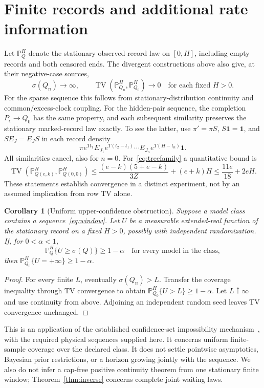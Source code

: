 \documentclass[aps,pre,onecolumn,11pt,longbibliography,notitlepage]{revtex4-2}
\newtheorem{corollary}[theorem]{Corollary}
\newcommand{\1}{\mathbf 1}
\newcommand{\TV}{\operatorname{TV}}
\newcommand{\sig}{\sigma}
\begin{document}
\section{Finite records and additional rate information}\label{sec:records}
Let $\mathbb P_{Q}^{H}$ denote the stationary observed-record law on $[0,H]$, including empty records and both censored ends. The divergent constructions above also give, at their negative-case sources,
\begin{equation}
 \sig(Q_n)\to\infty,\qquad\TV(\mathbb P_{Q_n}^{H},\mathbb P_{Q_0}^{H})\to0
 \quad\text{for each fixed }H>0.\label{eq:window}
\end{equation}
For the sparse sequence this follows from stationary-distribution continuity and common/excess-clock coupling. For the hidden-pair sequence, the completion $P_\epsilon\to Q_0$ has the same property, and each subsequent similarity preserves the stationary marked-record law exactly. To see the latter, use $\pi'=\pi S$, $S\1=\1$, and $SE_J=E_JS$ in each record density
\begin{equation}
 \pi e^{Tt_1}E_{J_1}e^{T(t_2-t_1)}\cdots E_{J_n}e^{T(H-t_n)}\1.\label{eq:likelihood}
\end{equation}
All similarities cancel, also for $n=0$. For~\eqref{eq:treefamily} a quantitative bound is
\begin{equation}
 \TV(\mathbb P_{Q(e,k)}^{H},\mathbb P_{Q(0,0)}^{H})
 \le\frac{(e-k)(5+e-k)}{3Z}+(e+k)H
 \le\frac{11e}{18}+2eH.\label{eq:windowtree}
\end{equation}
These statements establish convergence in a distinct experiment, not by an assumed implication from row TV alone.

\begin{corollary}[Uniform upper-confidence obstruction]\label{cor:confidence}
Suppose a model class contains a sequence~\eqref{eq:window}. Let $U$ be a measurable extended-real function of the stationary record on a fixed $H>0$, possibly with independent randomization. If, for $0<\alpha<1$,
\begin{equation}
 \mathbb P_Q^H\{U\ge\sig(Q)\}\ge1-\alpha\quad\text{for every model in the class},
\end{equation}
then $\mathbb P_{Q_0}^H\{U=+\infty\}\ge1-\alpha$.
\end{corollary}
\begin{proof}
For every finite $L$, eventually $\sig(Q_n)>L$. Transfer the coverage inequality through TV convergence to obtain $\mathbb P_{Q_0}^H\{U>L\}\ge1-\alpha$. Let $L\uparrow\infty$ and use continuity from above. Adjoining an independent random seed leaves TV convergence unchanged.
\end{proof}
This is an application of the established confidence-set impossibility mechanism~\cite{Moss2022}, with the required physical sequences supplied here. It concerns uniform finite-sample coverage over the declared class. It does not settle pointwise asymptotics, Bayesian prior restrictions, or a horizon growing jointly with the sequence. We also do not infer a cap-free positive continuity theorem from one stationary finite window; Theorem~\ref{thm:inverse} concerns complete joint waiting laws.
\end{document}
